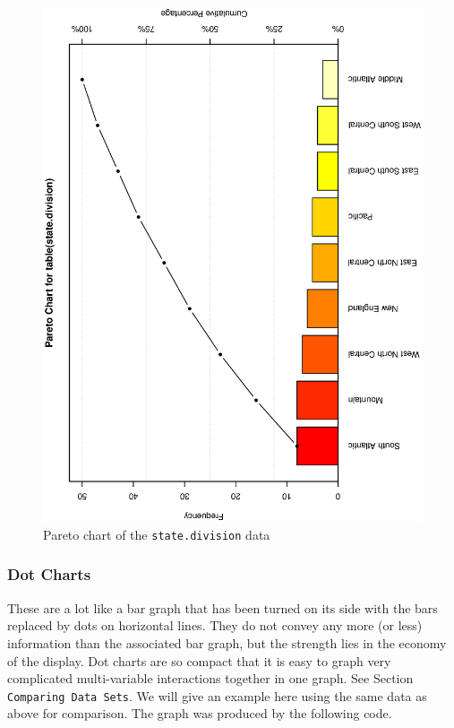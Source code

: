 \documentclass[10pt,english]{scrbook}
\begin{document}
\begin{exampletoo}
\begin{figure}[th]
  \includegraphics[angle=270, totalheight=4in]{ps/datadesc/Pareto-chart.ps}
  \caption{Pareto chart of the \texttt{state.division} data}
  \label{fig-Pareto-chart}
\end{figure}

\end{exampletoo}
\subsubsection[Dot Charts]{Dot Charts}
\label{sec-1-1-4-4}

These are a lot like a bar graph that has been turned on its side with the bars replaced by dots on horizontal lines. They do not convey any more (or less) information than the associated bar graph, but the strength lies in the economy of the display. Dot charts are so compact that it is easy to graph very complicated multi-variable interactions together in one graph. See Section \texttt{Comparing Data Sets}. We will give an example here using the same data as above for comparison. The graph was produced by the following code.
\end{document}
